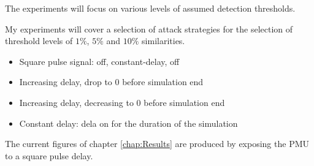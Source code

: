 




The experiments will focus on various levels of assumed detection thresholds.

My experiments will cover a selection of attack strategies for the selection of threshold levels of $1\%$, $5\%$ and $10\%$ similarities.

\begin{itemize}
    \item Square pulse signal: off, constant-delay, off
    \item Increasing delay, drop to 0 before simulation end
    \item Increasing delay, decreasing to 0 before simulation end
    \item Constant delay: dela on for the duration of the simulation
\end{itemize}

The current figures of chapter \ref{chap:Results} are produced by exposing the PMU to a square pulse delay.
%












